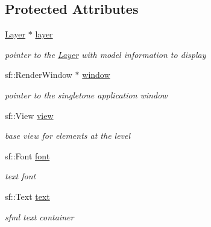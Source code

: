 \subsection*{Protected Attributes}
\begin{DoxyCompactItemize}
\item 
\mbox{\label{class_display_a78cd676fe244dad818b5567367fdfb33}} 
\hyperlink{class_layer}{Layer} $\ast$ \hyperlink{class_display_a78cd676fe244dad818b5567367fdfb33}{layer}
\begin{DoxyCompactList}\small\item\em pointer to the \hyperlink{class_layer}{Layer} with model information to display \end{DoxyCompactList}\item 
\mbox{\label{class_display_ab2bec26675f5903449716d95bb0107bd}} 
sf\+::\+Render\+Window $\ast$ \hyperlink{class_display_ab2bec26675f5903449716d95bb0107bd}{window}
\begin{DoxyCompactList}\small\item\em pointer to the singletone application window \end{DoxyCompactList}\item 
\mbox{\label{class_display_ad84f83c5fd704ce49ac3f038f07ae6dd}} 
sf\+::\+View \hyperlink{class_display_ad84f83c5fd704ce49ac3f038f07ae6dd}{view}
\begin{DoxyCompactList}\small\item\em base view for elements at the level \end{DoxyCompactList}\item 
\mbox{\label{class_display_a2c39b9f00cdfb5f4114c5a40e8af076d}} 
sf\+::\+Font \hyperlink{class_display_a2c39b9f00cdfb5f4114c5a40e8af076d}{font}
\begin{DoxyCompactList}\small\item\em text font \end{DoxyCompactList}\item 
\mbox{\label{class_display_a8369eaf8bd4706d966c7e1be78d061fe}} 
sf\+::\+Text \hyperlink{class_display_a8369eaf8bd4706d966c7e1be78d061fe}{text}
\begin{DoxyCompactList}\small\item\em sfml text container \end{DoxyCompactList}\item 

\end{DoxyCompactItemize}
